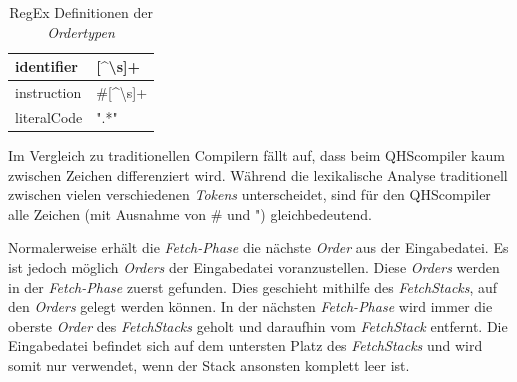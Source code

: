 \begin{table}[h]
    \fontsize{13}{17}\selectfont
    \centering
    \caption{RegEx Definitionen der \textit{Ordertypen}}
    \vspace{3mm} %
    
    \begin{tabular}{l>{\listingFont\selectfont}l}
    \multicolumn{1}{l|}{identifier}        & {[}\textasciicircum \textbackslash{}s{]}+                         \\ \hline
    \multicolumn{1}{l|}{instruction}       & \#{[}\textasciicircum \textbackslash{}s{]}+                      \\ \hline
    \multicolumn{1}{l|}{literalCode}       & ".*"                                                              \\
    
    \end{tabular}
\end{table}

Im Vergleich zu traditionellen Compilern fällt auf, dass beim QHScompiler kaum zwischen Zeichen differenziert wird. Während die lexikalische Analyse traditionell zwischen vielen verschiedenen \textit{Tokens} unterscheidet,
sind für den QHScompiler alle Zeichen (mit Ausnahme von {\listingFont\selectfont \#} und {\listingFont\selectfont "{}}) gleichbedeutend.

Normalerweise erhält die \textit{Fetch-Phase} die nächste \textit{Order} aus der Eingabedatei. 
Es ist jedoch möglich \textit{Orders} der Eingabedatei voranzustellen. Diese \textit{Orders} werden in der \textit{Fetch-Phase} zuerst gefunden. Dies geschieht mithilfe des \textit{FetchStacks}, auf den \textit{Orders} gelegt werden können.
In der nächsten \textit{Fetch-Phase} wird immer die oberste \textit{Order} des \textit{FetchStacks} geholt und daraufhin vom \textit{FetchStack} entfernt.
Die Eingabedatei befindet sich auf dem untersten Platz des \textit{FetchStacks} und wird somit nur verwendet, wenn der Stack ansonsten komplett leer ist.


